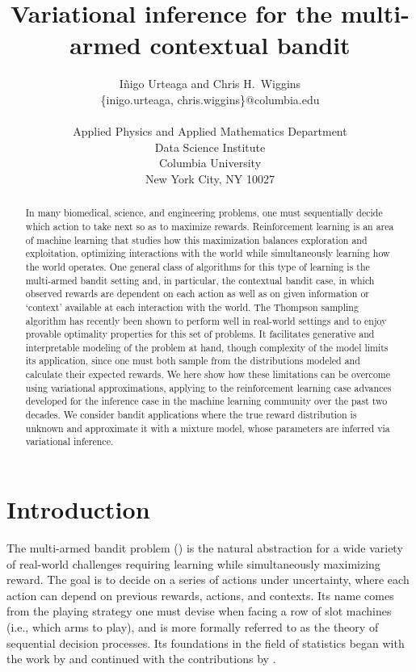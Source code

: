 \documentclass[10pt]{article}
\title{Variational inference for the multi-armed contextual bandit}
\author{ I\~{n}igo Urteaga and Chris H.~Wiggins\\
	{\sf \{inigo.urteaga, chris.wiggins\}@columbia.edu} \\\\
	Applied Physics and Applied Mathematics Department\\
	Data Science Institute\\
	Columbia University\\
	New York City, NY 10027
}
\newcommand{\ie}{i.e., }
\begin{document}
\maketitle

\begin{abstract}
In many biomedical, science, and engineering problems, one must sequentially decide which action to take next so as to maximize rewards. Reinforcement learning is an area of machine learning that studies how this maximization balances exploration and exploitation, optimizing interactions with the world while simultaneously learning how the world operates. One general class of algorithms for this type of learning is the multi-armed bandit setting and, in particular, the contextual bandit case, in which observed rewards are dependent on each action as well as on given information or `context' available at each interaction with the world. The Thompson sampling algorithm has recently been shown to perform well in real-world settings and to enjoy provable optimality properties for this set of problems. It facilitates  generative and interpretable modeling of the problem at hand, though complexity of the model limits its application, since one must both sample from the distributions modeled and calculate their expected rewards. We here show how these limitations can be overcome using variational approximations, applying to the reinforcement learning case advances developed for the inference case in the machine learning community over the past two decades. We consider bandit applications where the true reward distribution is unknown and approximate it with a mixture model, whose parameters are inferred via variational inference.
\end{abstract}

\section{Introduction}
\label{sec:introduction}

The multi-armed bandit problem (\cite{b-Sutton1998,j-Ghavamzadeh2015}) is the natural abstraction for a wide variety of real-world challenges requiring learning while simultaneously maximizing reward. The goal is to decide on a series of actions under uncertainty, where each action can depend on previous rewards, actions, and contexts. Its name comes from the playing strategy one must devise when facing a row of slot machines (\ie which arms to play), and is more formally referred to as the theory of sequential decision processes. Its foundations in the field of statistics began with the work by \cite{j-Thompson1933,j-Thompson1935} and continued with the contributions by \cite{j-Robbins1952}.
\end{document}
